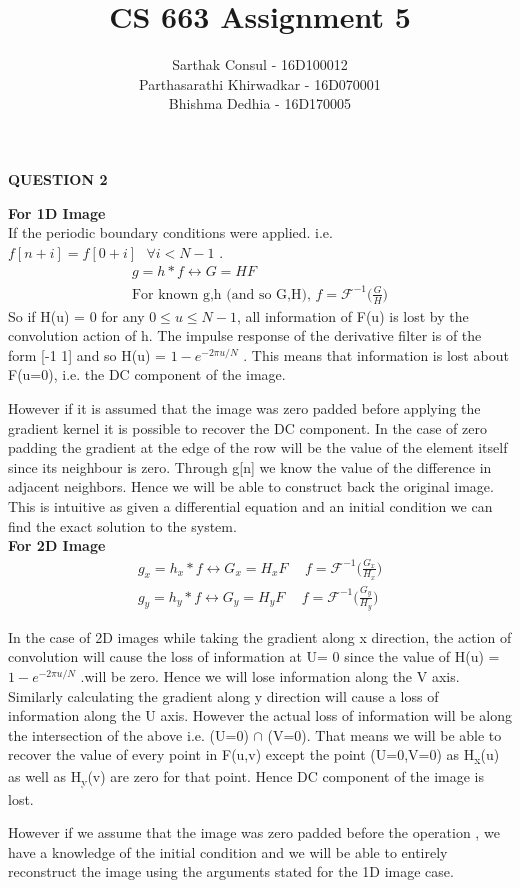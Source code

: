 \documentclass{article}
\title{CS 663 Assignment 5}
\author{Sarthak Consul - 16D100012\\
Parthasarathi Khirwadkar - 16D070001\\
Bhishma Dedhia - 16D170005}
\date{}
\begin{document}
\maketitle
\centerline{\textbf{\large\large{{{QUESTION 2}}}}}
\textbf{For 1D Image}\\
If the periodic boundary conditions were applied. i.e. $f[n+i] = f[0+i] \hspace{8pt}\forall i<N-1$
. 
\begin{align*}
    g = h*f \longleftrightarrow G = HF\\
    \text{For known g,h (and so G,H), }f = \mathscr{F}^{-1}\bigg(\frac{G}{H}\bigg)
\end{align*}
So if H(u) = 0 for any $0\leq u \leq N-1$, all information of F(u) is lost by the convolution action of h. The impulse response of the derivative filter is of the form [-1 1]  and so H(u) = $1 - e^{-2\pi u/N }$ . This means that information is lost about F(u=0), i.e. the DC component of the image. 

However if it is assumed that the image was zero padded before applying the gradient kernel it is possible to recover the DC component. In the case of zero padding the gradient at the edge of the row will be the value of the element itself since its neighbour is zero. Through g[n] we know the value of the difference in adjacent neighbors. Hence we will be able to construct back the original image. This is intuitive as given a differential equation and an initial condition we can find the exact solution to the system.\\

\textbf{For 2D Image}\\
\begin{align*}
    g_x = h_x*f \longleftrightarrow G_x = H_x F \hspace{15pt} f = \mathscr{F}^{-1}\bigg(\frac{G_x}{H_x}\bigg)\\
    g_y = h_y*f \longleftrightarrow G_y = H_y F \hspace{15pt} f = \mathscr{F}^{-1}\bigg(\frac{G_y}{H_y}\bigg)
\end{align*}

In the case of 2D images while taking the gradient along x direction, the action of convolution will cause the loss of information at U= 0 since the value of H(u) =  $1 - e^{-2\pi u/N }$ .will be zero. Hence we will lose information along the V axis. Similarly calculating the gradient along y direction will cause a loss of information along the U axis. However the actual loss of information will be along the intersection of the above i.e. (U=0) $\cap$ (V=0). That means we will be able to recover the value of every point in F(u,v) except the point (U=0,V=0) as H\textsubscript{x}(u) as well as H\textsubscript{y}(v) are zero for that point. Hence DC component of the image is lost.

However if we assume that the image was zero padded before the operation , we have a knowledge of the initial condition and we will be able to entirely reconstruct the image using the arguments stated for the 1D image case.
\end{document}
